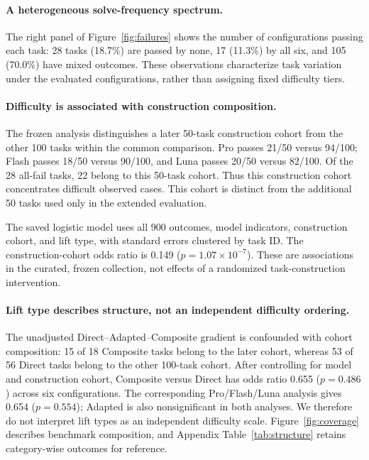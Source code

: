 \documentclass[acmsmall,screen,review,anonymous,nonacm]{acmart}
\begin{document}
\paragraph{A heterogeneous solve-frequency spectrum.}
The right panel of Figure~\ref{fig:failures} shows the number of configurations
passing each task: 28 tasks (18.7\%) are passed by none, 17 (11.3\%) by all six,
and 105 (70.0\%) have mixed outcomes. These observations characterize task
variation under the evaluated configurations, rather than assigning fixed
difficulty tiers.

\paragraph{Difficulty is associated with construction composition.}
The frozen analysis distinguishes a later 50-task construction cohort from the
other 100 tasks within the common comparison. Pro passes 21/50 versus 94/100;
Flash passes 18/50 versus 90/100, and Luna passes 20/50 versus 82/100.
Of the 28 all-fail tasks, 22 belong to this 50-task cohort. Thus this construction
cohort concentrates difficult observed cases. This cohort is distinct from the additional
50 tasks used only in the extended evaluation.

The saved logistic model uses all 900 outcomes, model indicators, construction
cohort, and lift type, with standard errors clustered by task ID. The
construction-cohort odds ratio is 0.149 ($p=1.07\times10^{-7}$).
These are associations in the curated, frozen collection, not effects of a
randomized task-construction intervention.

\paragraph{Lift type describes structure, not an independent difficulty ordering.}
The unadjusted Direct--Adapted--Composite gradient is confounded with cohort
composition: 15 of 18 Composite tasks belong to the later cohort, whereas
53 of 56 Direct tasks belong to the other 100-task cohort. After controlling
for model and construction cohort, Composite versus Direct has odds ratio
0.655 ($p=0.486$) across six configurations. The corresponding Pro/Flash/Luna
analysis gives 0.654 ($p=0.554$); Adapted is also nonsignificant in both analyses.
We therefore do not interpret lift types as an independent difficulty scale.
Figure~\ref{fig:coverage} describes benchmark composition, and
Appendix Table~\ref{tab:structure} retains category-wise outcomes for reference.
\end{document}
